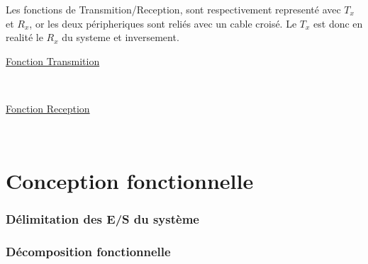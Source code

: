 \documentclass[11pt, french]{article} %
\begin{document}
\newpage

Les fonctions de Transmition/Reception, sont respectivement representé avec $T_x$ et $R_x$, or les deux péripheriques sont reliés avec un cable croisé. Le $T_x$ est donc en realité le $R_x$ du systeme et inversement.


\begin{minipage}[t, h]{5cm}
\hspace{0.2in}
\underline{Fonction Transmition}
\end{minipage}
~
\begin{minipage}[t, h]{9cm}

\end{minipage}

\begin{minipage}[t, h]{5cm}
\hspace{0.2in}
\underline{Fonction Reception}
\end{minipage}
~
\begin{minipage}[t, h]{9cm}

\end{minipage}

\part{Conception fonctionnelle}
\section{Délimitation des E/S du système}



\section{Décomposition fonctionnelle}
\end{document}

